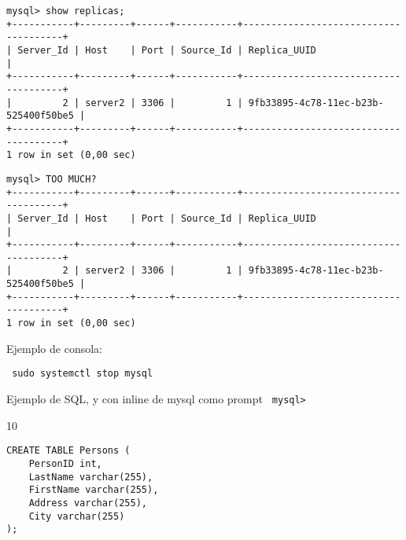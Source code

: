 \documentclass[12pt,a4paper,openany]{book}
\begin{document}
\begin{tcolorbox}[arc=3mm,colback=solarizeddark,title=My heading line,capture=minipage]
\begin{verbatim}
mysql> show replicas;
+-----------+---------+------+-----------+--------------------------------------+
| Server_Id | Host    | Port | Source_Id | Replica_UUID                         |
+-----------+---------+------+-----------+--------------------------------------+
|         2 | server2 | 3306 |         1 | 9fb33895-4c78-11ec-b23b-525400f50be5 |
+-----------+---------+------+-----------+--------------------------------------+
1 row in set (0,00 sec)
\end{verbatim}
\end{tcolorbox}

\begin{tcolorbox}[arc=3mm,colback=solarizeddark,title=My heading line,capture=minipage]
\begin{verbatim}
mysql> TOO MUCH?
+-----------+---------+------+-----------+--------------------------------------+
| Server_Id | Host    | Port | Source_Id | Replica_UUID                         |
+-----------+---------+------+-----------+--------------------------------------+
|         2 | server2 | 3306 |         1 | 9fb33895-4c78-11ec-b23b-525400f50be5 |
+-----------+---------+------+-----------+--------------------------------------+
1 row in set (0,00 sec)
\end{verbatim}
\end{tcolorbox}

\begin{tcolorbox}[capture=minipage]%
\lipsum[1]
\end{tcolorbox}


Ejemplo de consola: 	
\begin{verbatim}
 sudo systemctl stop mysql
\end{verbatim}

Ejemplo de SQL, y con inline de mysql como prompt \texttt{ mysql> }


\begin{tcolorbox}[arc=1mm,width=1cm,halign=center,valign=center,square]
10
\end{tcolorbox}





\begin{tcolorbox}[arc=3mm,colback=solarizeddark,title=My heading line]
	\begin{verbatim}
CREATE TABLE Persons (
    PersonID int,
    LastName varchar(255),
    FirstName varchar(255),
    Address varchar(255),
    City varchar(255)
);
	\end{verbatim}
\end{tcolorbox}
\end{document}
